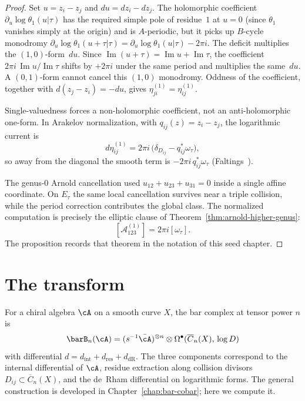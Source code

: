 \begin{proof}
Set $u=z_i-z_j$ and $du=dz_i-dz_j$. The holomorphic coefficient
$\partial_u\log\theta_1(u|\tau)$ has the required simple pole of
residue~$1$ at $u=0$ (since $\theta_1$ vanishes simply at the
origin) and is $A$-periodic, but it picks up $B$-cycle monodromy
$\partial_u\!\log\theta_1(u + \tau|\tau)
 = \partial_u\!\log\theta_1(u|\tau) - 2\pi i$.
The deficit multiplies the $(1,0)$-form~$du$. Since
$\operatorname{Im}(u+\tau)=\operatorname{Im}u+\operatorname{Im}\tau$,
the coefficient
$2\pi i\,\operatorname{Im}u/\operatorname{Im}\tau$ shifts by
$+2\pi i$ under the same period and multiplies the same~$du$. A
$(0,1)$-form cannot cancel this $(1,0)$ monodromy. Oddness of the
coefficient, together with $d(z_j-z_i)=-du$, gives
$\eta^{(1)}_{ji}=\eta^{(1)}_{ij}$.

Single-valuedness forces a non-holomorphic coefficient, not an
anti-holomorphic one-form. In Arakelov normalization, with
$q_{ij}(z)=z_i-z_j$, the logarithmic current is
\[
d\eta^{(1)}_{ij}
=
2\pi i\,\bigl(\delta_{D_{ij}}-q_{ij}^{*}\omega_\tau\bigr),
\]
so away from the diagonal the smooth term is
$-2\pi i\,q_{ij}^{*}\omega_\tau$ (Faltings~\cite{Fal84}).

The genus-$0$ Arnold cancellation used
$u_{12}+u_{23}+u_{31}=0$ inside a single affine coordinate. On
$E_\tau$ the same local cancellation survives near a triple
collision, while the period correction contributes the global class.
The normalized computation is precisely the elliptic clause of
Theorem~\ref{thm:arnold-higher-genus}:
\[
[\mathcal A^{(1)}_{123}]=2\pi i[\omega_\tau].
\]
The proposition records that theorem in the notation of this seed
chapter.
\end{proof}


\section{The transform}\label{sec:fourier-transform}

\begin{definition}
\label{def:fourier-bar-transform}
For a chiral algebra $\cA$ on a smooth curve $X$, the bar complex
at tensor power $n$ is
\begin{equation}\label{eq:fourier-bar-transform}
\barB_n(\cA) = (s^{-1}\bar{\cA})^{\otimes n}
\otimes \Omega^\bullet(\overline{C}_n(X),\, \log D)
\end{equation}
with differential $d = d_{\mathrm{int}} + d_{\mathrm{res}}
+ d_{\mathrm{dR}}$. The three components correspond to the internal
differential of $\cA$, residue extraction along collision divisors
$D_{ij} \subset \overline{C}_n(X)$, and the de~Rham differential on
logarithmic forms. The general construction is developed in
Chapter~\ref{chap:bar-cobar}; here we compute it.
\end{definition}

